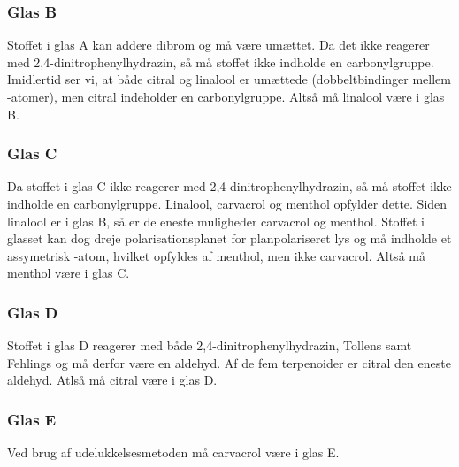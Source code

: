 \documentclass{report}
\begin{document}
\subsubsection{Glas B}
Stoffet i glas A kan addere dibrom og må være umættet.
Da det ikke reagerer med 2,4-dinitrophenylhydrazin, så må stoffet ikke indholde en carbonylgruppe.
Imidlertid ser vi, at både citral og linalool er umættede (dobbeltbindinger mellem -atomer), men citral indeholder en carbonylgruppe.
Altså må linalool være i glas B.
\subsubsection{Glas C}
Da stoffet i glas C ikke reagerer med 2,4-dinitrophenylhydrazin, så må stoffet ikke indholde en carbonylgruppe.
Linalool, carvacrol og menthol opfylder dette.
Siden linalool er i glas B, så er de eneste muligheder carvacrol og menthol.
Stoffet i glasset kan dog dreje polarisationsplanet for planpolariseret lys og må indholde et assymetrisk -atom, hvilket opfyldes af menthol, men ikke carvacrol.
Altså må menthol være i glas C.
\subsubsection{Glas D}
Stoffet i glas D reagerer med både 2,4-dinitrophenylhydrazin, Tollens samt Fehlings og må derfor være en aldehyd.
Af de fem terpenoider er citral den eneste aldehyd.
Atlså må citral være i glas D.
\subsubsection{Glas E}
Ved brug af udelukkelsesmetoden må carvacrol være i glas E.
\end{document}
